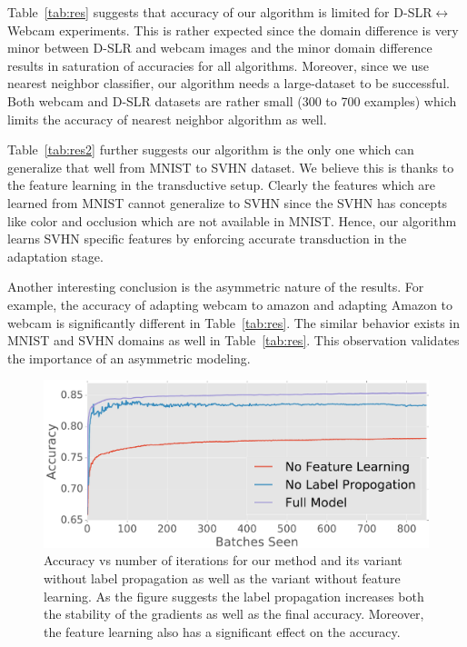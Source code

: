 Table~\ref{tab:res} suggests that accuracy of our algorithm is limited  for D-SLR$\leftrightarrow$Webcam experiments. This is rather expected since the domain difference is very minor between D-SLR and webcam images and the minor domain difference results in saturation of accuracies for all algorithms. Moreover, since we use nearest neighbor classifier, our algorithm needs a large-dataset to be successful. Both webcam and D-SLR datasets are rather small (300 to 700 examples) which limits the accuracy of nearest neighbor algorithm as well.

Table~\ref{tab:res2} further suggests our algorithm is the only one which can generalize that well from MNIST to SVHN dataset. We believe this is thanks to the feature learning in the transductive setup. Clearly the features which are learned from MNIST cannot generalize to SVHN since the SVHN has concepts like color and occlusion which are not available in MNIST. Hence, our algorithm learns SVHN specific features by enforcing accurate transduction in the adaptation stage.

Another interesting conclusion is the asymmetric nature of the results. For example, the accuracy of adapting webcam to amazon and adapting Amazon to webcam is significantly different in Table~\ref{tab:res}. The similar behavior exists in MNIST and SVHN domains as well in Table~\ref{tab:res}. This observation validates the importance of an asymmetric modeling.

\begin{figure}[ht]
\includegraphics[width=\columnwidth]{no_feature_propogation}
\caption{Accuracy vs number of iterations for our method and its variant without label propagation as well as the variant without feature learning. As the figure suggests the label propagation increases both the stability of the gradients as well as the final accuracy. Moreover, the feature learning also has a significant effect on the accuracy.}
\label{fllprop}
\end{figure}

